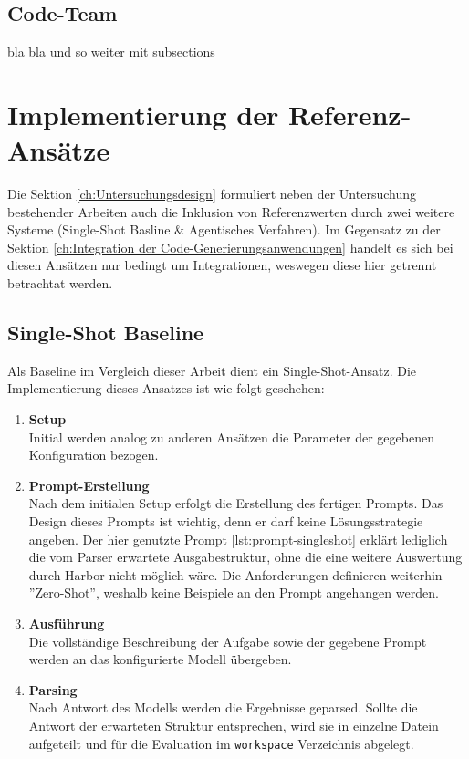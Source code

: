 
\subsection{Code-Team}

bla bla und so weiter mit subsections

\section{Implementierung der Referenz-Ansätze}

Die Sektion \ref{ch:Untersuchungsdesign} formuliert neben der Untersuchung bestehender Arbeiten auch die Inklusion von Referenzwerten durch zwei weitere Systeme (Single-Shot Basline \& Agentisches Verfahren). Im Gegensatz zu der Sektion \ref{ch:Integration der Code-Generierungsanwendungen} handelt es sich bei diesen Ansätzen nur bedingt um Integrationen, weswegen diese hier getrennt betrachtat werden.

\subsection{Single-Shot Baseline}\label{ch:Impl:Single-Shot Baseline}

Als Baseline im Vergleich dieser Arbeit dient ein Single-Shot-Ansatz. Die Implementierung dieses Ansatzes ist wie folgt geschehen:

\begin{enumerate}
    \item \textbf{Setup} \\ Initial werden analog zu anderen Ansätzen die Parameter der gegebenen Konfiguration bezogen.
    \item \textbf{Prompt-Erstellung} \\ Nach dem initialen Setup erfolgt die Erstellung des fertigen Prompts. Das Design dieses Prompts ist wichtig, denn er darf keine Lösungsstrategie angeben. Der hier genutzte Prompt \autoref{lst:prompt-singleshot} erklärt lediglich die vom Parser erwartete Ausgabestruktur, ohne die eine weitere Auswertung durch Harbor nicht möglich wäre. Die Anforderungen definieren weiterhin ''Zero-Shot'', weshalb keine Beispiele an den Prompt angehangen werden.
    \item \textbf{Ausführung} \\ Die vollständige Beschreibung der Aufgabe sowie der gegebene Prompt werden an das konfigurierte Modell übergeben.
    \item \textbf{Parsing} \\ Nach Antwort des Modells werden die Ergebnisse geparsed. Sollte die Antwort der erwarteten Struktur entsprechen, wird sie in einzelne Datein aufgeteilt und für die Evaluation im \texttt{workspace} Verzeichnis abgelegt.
\end{enumerate}

